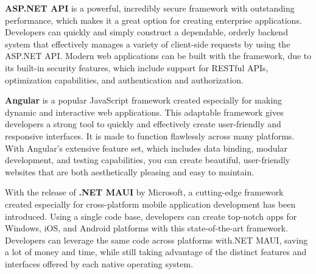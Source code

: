 \textbf{ASP.NET API} is a powerful, incredibly secure framework with outstanding performance, which makes it a great option for creating enterprise applications. Developers can quickly and simply construct a dependable, orderly backend system that effectively manages a variety of client-side requests by using the ASP.NET API. Modern web applications can be built with the framework, due to its built-in security features, which include support for RESTful APIs, optimization capabilities, and authentication and authorization. \cite{aspnet}

\textbf{Angular} is a popular JavaScript framework created especially for making dynamic and interactive web applications. This adaptable framework gives developers a strong tool to quickly and effectively create user-friendly and responsive interfaces. It is made to function flawlessly across many platforms. With Angular's extensive feature set, which includes data binding, modular development, and testing capabilities, you can create beautiful, user-friendly websites that are both aesthetically pleasing and easy to maintain. \cite{angular}

With the release of \textbf{.NET MAUI} by Microsoft, a cutting-edge framework created especially for cross-platform mobile application development has been introduced. Using a single code base, developers can create top-notch apps for Windows, iOS, and Android platforms with this state-of-the-art framework. Developers can leverage the same code across platforms with.NET MAUI, saving a lot of money and time, while still taking advantage of the distinct features and interfaces offered by each native operating system. \cite{maui}


